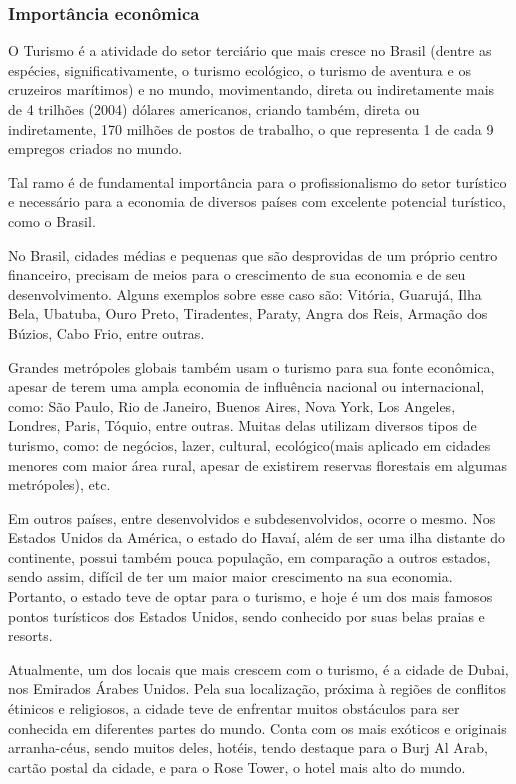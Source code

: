 \documentclass[a4paper,10pt]{article}
\begin{document}
\subsubsection{Importância econômica}
O Turismo é a atividade do setor terciário que mais cresce no Brasil (dentre as espécies, significativamente, o turismo ecológico, o turismo de aventura e os cruzeiros marítimos) e no mundo, movimentando, direta ou indiretamente mais de 4 trilhões (2004) dólares americanos, criando também, direta ou indiretamente, 170 milhões de postos de trabalho, o que representa 1 de cada 9 empregos criados no mundo.

Tal ramo é de fundamental importância para o profissionalismo do setor turístico e necessário para a economia de diversos países com excelente potencial turístico, como o Brasil.

No Brasil, cidades médias e pequenas que são desprovidas de um próprio centro financeiro, precisam de meios para o crescimento de sua economia e de seu desenvolvimento. Alguns exemplos sobre esse caso são: Vitória, Guarujá, Ilha Bela, Ubatuba, Ouro Preto, Tiradentes, Paraty, Angra dos Reis, Armação dos Búzios, Cabo Frio, entre outras.

Grandes metrópoles globais também usam o turismo para sua fonte econômica, apesar de terem uma ampla economia de influência nacional ou internacional, como: São Paulo, Rio de Janeiro, Buenos Aires, Nova York, Los Angeles, Londres, Paris, Tóquio, entre outras. Muitas delas utilizam diversos tipos de turismo, como: de negócios, lazer, cultural, ecológico(mais aplicado em cidades menores com maior área rural, apesar de existirem reservas florestais em algumas metrópoles), etc.

Em outros países, entre desenvolvidos e subdesenvolvidos, ocorre o mesmo. Nos Estados Unidos da América, o estado do Havaí, além de ser uma ilha distante do continente, possui também pouca população, em comparação a outros estados, sendo assim, difícil de ter um maior maior crescimento na sua economia. Portanto, o estado teve de optar para o turismo, e hoje é um dos mais famosos pontos turísticos dos Estados Unidos, sendo conhecido por suas belas praias e resorts.

Atualmente, um dos locais que mais crescem com o turismo, é a cidade de Dubai, nos Emirados Árabes Unidos. Pela sua localização, próxima à regiões de conflitos étinicos e religiosos, a cidade teve de enfrentar muitos obstáculos para ser conhecida em diferentes partes do mundo. Conta com os mais exóticos e originais arranha-céus, sendo muitos deles, hotéis, tendo destaque para o Burj Al Arab, cartão postal da cidade, e para o Rose Tower, o hotel mais alto do mundo.
\end{document}
